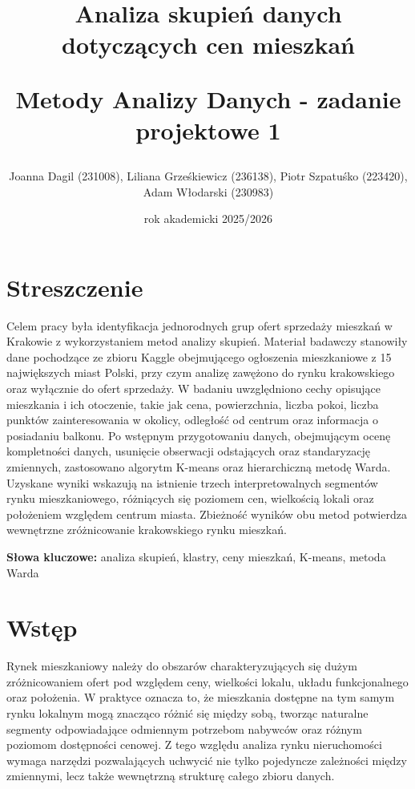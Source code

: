 \documentclass{report}
\title{\LARGE{Analiza skupień danych dotyczących cen mieszkań}

\vspace{0.3cm}

\Large{Metody Analizy Danych - zadanie projektowe 1}}
\author{
Joanna Dagil (231008),
Liliana Grześkiewicz (236138),
Piotr Szpatuśko (223420),
Adam Włodarski (230983)
}
\date{rok akademicki 2025/2026}
\begin{document}
\maketitle

\tableofcontents

\chapter*{Streszczenie}

Celem pracy była identyfikacja jednorodnych grup ofert sprzedaży mieszkań w Krakowie z wykorzystaniem metod analizy skupień. 
Materiał badawczy stanowiły dane pochodzące ze zbioru Kaggle obejmującego ogłoszenia mieszkaniowe z 15 największych miast Polski, przy czym analizę zawężono do rynku krakowskiego oraz wyłącznie do ofert sprzedaży. 
W badaniu uwzględniono cechy opisujące mieszkania i ich otoczenie, takie jak cena, powierzchnia, liczba pokoi, liczba punktów zainteresowania w okolicy, odległość od centrum oraz informacja o posiadaniu balkonu. 
Po wstępnym przygotowaniu danych, obejmującym ocenę kompletności danych, usunięcie obserwacji odstających oraz standaryzację zmiennych, zastosowano algorytm K-means oraz hierarchiczną metodę Warda. 
Uzyskane wyniki wskazują na istnienie trzech interpretowalnych segmentów rynku mieszkaniowego, różniących się poziomem cen, wielkością lokali oraz położeniem względem centrum miasta. 
Zbieżność wyników obu metod potwierdza wewnętrzne zróżnicowanie krakowskiego rynku mieszkań.

\vspace{0.5cm}
\noindent\textbf{Słowa kluczowe:} analiza skupień, klastry, ceny mieszkań, K-means, metoda Warda

\chapter{Wstęp}

Rynek mieszkaniowy należy do obszarów charakteryzujących się dużym zróżnicowaniem ofert pod względem ceny, wielkości lokalu, układu funkcjonalnego oraz położenia. 
W praktyce oznacza to, że mieszkania dostępne na tym samym rynku lokalnym mogą znacząco różnić się między sobą, tworząc naturalne segmenty odpowiadające odmiennym potrzebom nabywców oraz różnym poziomom dostępności cenowej. 
Z tego względu analiza rynku nieruchomości wymaga narzędzi pozwalających uchwycić nie tylko pojedyncze zależności między zmiennymi, lecz także wewnętrzną strukturę całego zbioru danych.
\end{document}
